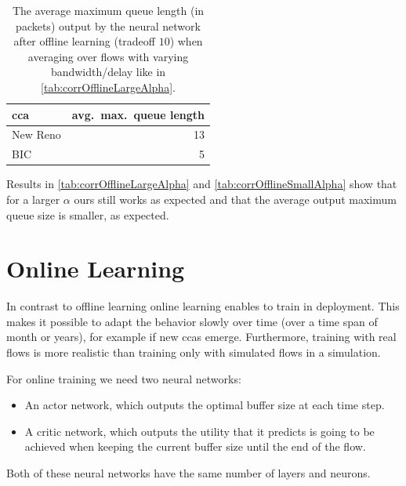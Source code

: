 \documentclass[conference]{IEEEtran}
\begin{document}
\begin{table}[h]
\caption{The average maximum queue length (in packets) output by the neural network after offline learning (tradeoff $10$) when averaging over flows with varying bandwidth/delay like in \autoref{tab:corrOfflineLargeAlpha}.} \label{tab:avgOfflineLargeAlpha}
\centering
\begin{tabular}{lr} \toprule
\gls{cca} & avg.~max.~queue length \\ \midrule
New Reno & 13 \\
BIC & 5 \\
\bottomrule
\end{tabular}
\end{table}

Results in \autoref{tab:corrOfflineLargeAlpha} and \autoref{tab:corrOfflineSmallAlpha} show that for a larger $\alpha$ \gls{ours} still works as expected and that the average output maximum queue size is smaller, as expected. 

\section{Online Learning}

In contrast to offline learning online learning enables to train in deployment. This makes it possible to adapt the behavior slowly over time (over a time span of month or years), for example if new \glspl{cca} emerge. Furthermore, training with real flows is more realistic than training only with simulated flows in a simulation. 

For online training we need two neural networks: 
\begin{itemize}
\item An actor network, which outputs the optimal buffer size at each time step.
\item A critic network, which outputs the utility that it predicts is going to be achieved when keeping the current buffer size until the end of the flow. 
\end{itemize}
Both of these neural networks have the same number of layers and neurons. 
\end{document}
